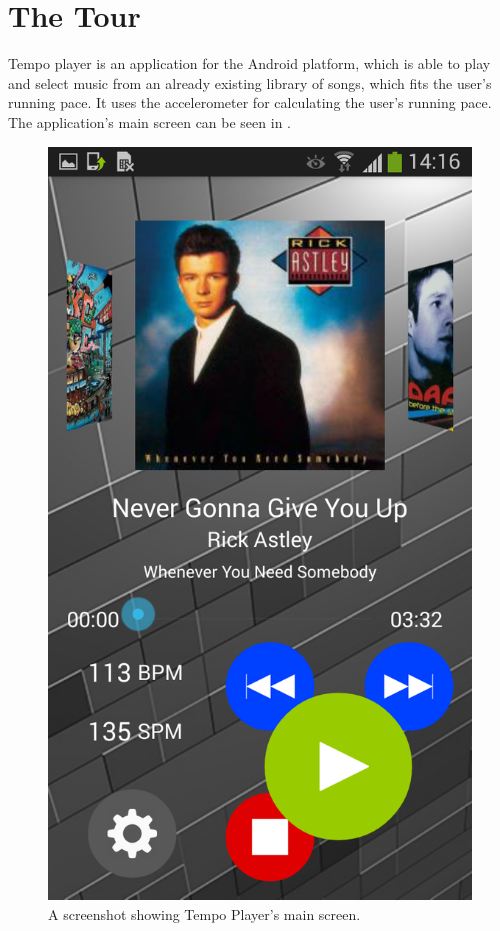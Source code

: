 \section{The Tour}
Tempo player is an application for the Android platform, which is able to play and select music from an already existing library of songs, which fits the user's running pace. It uses the accelerometer for calculating the user's running pace. The application's main screen can be seen in . 

\begin{figure}[h!]
  \centering
    \includegraphics[scale=0.2]{Images/Screenshots/mainScreen.png}
  \caption{A screenshot showing Tempo Player's main screen.}
  \label{fig:mainScreen}
\end{figure}

